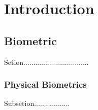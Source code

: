 
\chapter{Introduction}
\label{chap01:chapter}

\section{Biometric}
Setion.................................
\subsection{Physical Biometrics}
Subsetion..................
